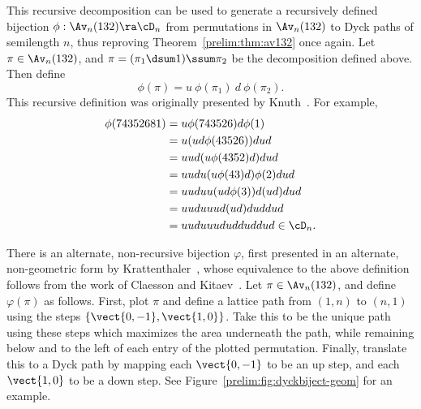 \documentclass[12pt,twoside]{memoir}
\begin{document}
      This recursive decomposition can be used to generate a recursively defined
      bijection $\phi: \Av_n(132) \ra \cD_n$ from permutations in $\Av_n (132)$
      to Dyck paths of semilength $n$, thus reproving 
      Theorem~\ref{prelim:thm:av132} once again. Let $\pi \in \Av_n(132)$, and $\pi = (\pi_1
      \dsum 1) \ssum \pi_2$ be the decomposition defined above. Then define 
      $$\phi(\pi) = u \ \phi(\pi_1) \ d \ \phi(\pi_2).$$
      This recursive definition was originally presented by Knuth~\cite{Knuth}.
      For example, 
      $$ \begin{aligned}
        \phi(74352681) 
          &= u\phi(743526)d\phi(1) \\
          &= u (ud \phi(43526)) d ud \\
          &= uud (u\phi(4352)d) dud \\
          &= uudu (u\phi(43)d)\phi(2) dud\\
          &= uuduu (ud\phi(3))d (ud) dud \\
          &= uuduuud (ud) duddud \\
          &= uuduuududduddud \in \cD_n.
      \end{aligned} $$
      
      There is an alternate, non-recursive bijection $\varphi$, first presented
      in an alternate, non-geometric form by
      Krattenthaler~\cite{Krattenthaler2001},
      whose equivalence to the above definition follows from the work of Claesson
      and Kitaev~\cite{Claesson2008}. Let $\pi \in \Av_n(132)$, and define
      $\varphi(\pi)$ as follows. First, plot $\pi$ and define a lattice path from
      $(1,n)$ to $(n,1)$ using the steps $\{\vect{0,-1}, \vect{1,0}\}$. Take this
      to be the unique path using these steps which maximizes the area underneath
      the path, while remaining below and to the left of each entry of the
      plotted permutation. Finally, translate this to a Dyck path by mapping each
      $\vect{0,-1}$ to be an up step, and each $\vect{1,0}$ to be a down step.
      See Figure~\ref{prelim:fig:dyckbiject-geom} for an example. 
\end{document}
